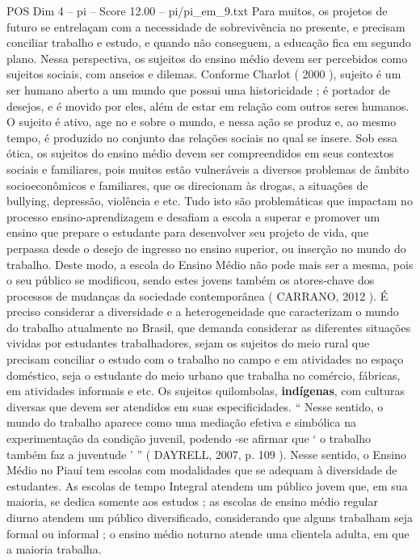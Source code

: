 \begin{textsample}{POS Dim 4 – pi – Score 12.00 – pi/pi\_em\_9.txt}
Para muitos, os projetos de futuro se entrelaçam com a necessidade de sobrevivência no presente, e precisam conciliar trabalho e estudo, e quando não conseguem, a educação fica em segundo plano.
Nessa perspectiva, os sujeitos do ensino médio devem ser percebidos como sujeitos sociais, com anseios e dilemas.
Conforme Charlot ( 2000 ), sujeito é um ser humano aberto a um mundo que possui uma historicidade ; é portador de desejos, e é movido por eles, além de estar em relação com outros seres humanos.
O sujeito é ativo, age no e sobre o mundo, e nessa ação se produz e, ao mesmo tempo, é produzido no conjunto das relações sociais no qual se insere.
Sob essa ótica, os sujeitos do ensino médio devem ser compreendidos em seus contextos sociais e familiares, pois muitos estão vulneráveis a diversos problemas de âmbito socioeconômicos e familiares, que os direcionam às drogas, a situações de bullying, depressão, violência e etc.
Tudo isto são problemáticas que impactam no processo ensino-aprendizagem e desafiam a escola a superar e promover um ensino que prepare o estudante para desenvolver seu projeto de vida, que perpassa desde o desejo de ingresso no ensino superior, ou inserção no mundo do trabalho.
Deste modo, a escola do Ensino Médio não pode mais ser a mesma, pois o seu público se modificou, sendo estes jovens também os atores-chave dos processos de mudanças da sociedade contemporânea ( CARRANO, 2012 ).
É preciso considerar a diversidade e a heterogeneidade que caracterizam o mundo do trabalho atualmente no Brasil, que demanda considerar as diferentes situações vividas por estudantes trabalhadores, sejam os sujeitos do meio rural que precisam conciliar o estudo com o trabalho no campo e em atividades no espaço doméstico, seja o estudante do meio urbano que trabalha no comércio, fábricas, em atividades informais e etc.
Os sujeitos quilombolas, \textbf{indígenas}, com culturas diversas que devem ser atendidos em suas especificidades. “ Nesse sentido, o mundo do trabalho aparece como uma mediação efetiva e simbólica na experimentação da condição juvenil, podendo -se afirmar que ‘ o trabalho também faz a juventude ’ ” ( DAYRELL, 2007, p. 109 ).
Nesse sentido, o Ensino Médio no Piauí tem escolas com modalidades que se adequam à diversidade de estudantes.
As escolas de tempo Integral atendem um público jovem que, em sua maioria, se dedica somente aos estudos ; as escolas de ensino médio regular diurno atendem um público diversificado, considerando que alguns trabalham seja formal ou informal ; o ensino médio noturno atende uma clientela adulta, em que a maioria trabalha.

\end{textsample}
